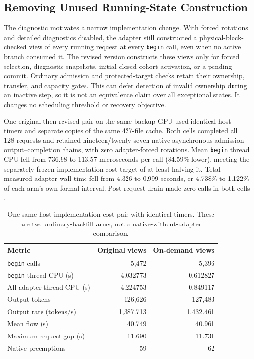 \documentclass[10pt]{article}
\begin{document}
\subsection{Removing Unused Running-State Construction}
The diagnostic motivates a narrow implementation change. With forced rotations and detailed diagnostics disabled, the adapter still constructed a physical-block-checked view of every running request at every \texttt{begin} call, even when no active branch consumed it. The revised version constructs these views only for forced selection, diagnostic snapshots, initial closed-cohort activation, or a pending commit. Ordinary admission and protected-target checks retain their ownership, transfer, and capacity gates. This can defer detection of invalid ownership during an inactive step, so it is not an equivalence claim over all exceptional states. It changes no scheduling threshold or recovery objective.

One original-then-revised pair on the same backup GPU used identical host timers and separate copies of the same 427-file cache. Both cells completed all 128 requests and retained nineteen/twenty-seven native asynchronous admission--output--completion chains, with zero adapter-forced rotations. Mean \texttt{begin} thread CPU fell from 736.98 to 113.57 microseconds per call (84.59\% lower), meeting the separately frozen implementation-cost target of at least halving it. Total measured adapter wall time fell from 4.326 to 0.999 seconds, or 4.738\% to 1.122\% of each arm's own formal interval. Post-request drain made zero calls in both cells \cite{nativelazy}.

\begin{table}[t]
\centering\small
\caption{One same-host implementation-cost pair with identical timers. These are two ordinary-backfill arms, not a native-without-adapter comparison.}
\label{tab:nativelazy}
\begin{tabular}{lrr}
\toprule
Metric & Original views & On-demand views \\
\midrule
\texttt{begin} calls & 5,472 & 5,396 \\
\texttt{begin} thread CPU (s) & 4.032773 & 0.612827 \\
All adapter thread CPU (s) & 4.224753 & 0.849117 \\
Output tokens & 126,626 & 127,483 \\
Output rate (tokens/s) & 1,387.713 & 1,432.461 \\
Mean flow (s) & 40.749 & 40.961 \\
Maximum request gap (s) & 11.690 & 11.731 \\
Native preemptions & 59 & 62 \\
\bottomrule
\end{tabular}
\end{table}
\end{document}
